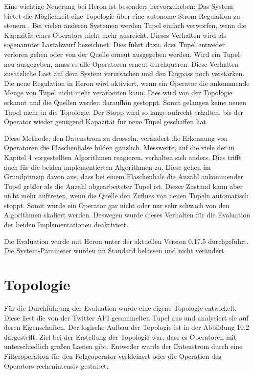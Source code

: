 Eine wichtige Neuerung bei Heron ist besonders hervorzuheben:
Das System bietet die Möglichkeit eine Topologie über eine autonome Strom-Regulation zu steuern \cite{kulkarni_twitter_2015}.
Bei vielen anderen Systemen werden Tupel einfach verworfen, wenn die Kapazität eines Operators nicht mehr ausreicht.
Dieses Verhalten wird als sogenannter Lastabwurf bezeichnet.
Dies führt dazu, dass Tupel entweder verloren gehen oder von der Quelle erneut ausgegeben werden.
Wird ein Tupel neu ausgegeben, muss es alle Operatoren erneut durchqueren.
Diese Verhalten zusätzliche Last auf dem System verursachen und den Engpass noch verstärken.
Die neue Regulation in Heron wird aktiviert, wenn ein Operator die ankommende Menge von Tupel nicht mehr verarbeiten kann.
Dies wird von der Topologie erkannt und die Quellen werden daraufhin gestoppt.
Somit gelangen keine neuen Tupel mehr in die Topologie.
Der Stopp wird so lange aufrecht erhalten, bis der Operator wieder genügend Kapazität für neue Tupel geschaffen hat.

Diese Methode, den Datenstrom zu drosseln, verändert die Erkennung von Operatoren die Flaschenhälse bilden gänzlich.
Messwerte, auf die viele der in Kapitel 4 vorgestellten Algorithmen reagieren, verhalten sich anders.
Dies trifft auch für die beiden implementierten Algorithmen zu.
Diese gehen im Grundprinzip davon aus, dass bei einem Flaschenhals die Anzahl ankommender Tupel größer als die Anzahl abgearbeiteter Tupel ist.
Dieser Zustand kann aber nicht mehr auftreten, wenn die Quelle den Zufluss von neuen Tupeln automatisch stoppt.
Somit würde ein Operator gar nicht oder nur sehr schwach von den Algorithmen skaliert werden.
Deswegen wurde dieses Verhalten für die Evaluation der beiden Implementationen deaktiviert.

Die Evaluation wurde mit Heron unter der aktuellen Version 0.17.5 durchgeführt.
Die System-Parameter wurden im Standard belassen und nicht verändert.

\section{Topologie}

Für die Durchführung der Evaluation wurde eine eigene Topologie entwickelt.
Diese liest die von der Twitter API gesammelten Tupel aus und analysiert sie auf deren Eigenschaften.
Der logische Aufbau der Topologie ist in der Abbildung 10.2 dargestellt.
Ziel bei der Erstellung der Topologie war, dass es Operatoren mit unterschiedlich großen Lasten gibt.
Entweder wurde der Datenstrom durch eine Filteroperation für den Folgeoperator verkleinert oder die Operation des Operators rechenintensiv gestaltet.

